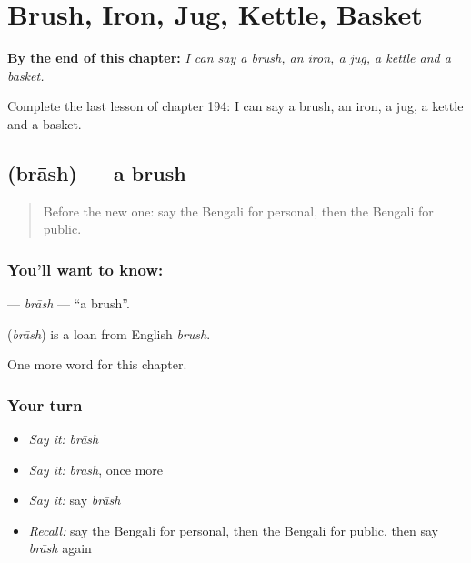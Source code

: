 
\chapter{Brush, Iron, Jug, Kettle, Basket}
\label{ch:bn-brush-iron-jug-kettle-basket}

\begin{chapteropening}
\textbf{By the end of this chapter:} \emph{I can say a brush, an iron, a jug, a kettle and a basket.}

Complete the last lesson of chapter 194: I can say a brush, an iron, a jug, a kettle and a basket.
\end{chapteropening}

\section[\texorpdfstring{\bn{ব্রাশ} (brāsh)}{ব্রাশ (brāsh)}]{ (brāsh) — a brush}

\label{lesson:BN-C194-brash}



\begin{quote}
Before the new one: say the Bengali for personal, then the Bengali for public.
\end{quote}

\subsection*{You'll want to know: }
\textbf{} — \emph{brāsh} — \textquotedblleft{}a brush\textquotedblright{}.

\begin{cousinweb}
\textbf{} (\emph{brāsh}) is a loan from English \emph{brush}.
\end{cousinweb}

\begin{grammarlens}[title={What you've built}]
One more word for this chapter.
\end{grammarlens}

\subsection*{Your turn}
\begin{itemize}
\raggedright
  \item \emph{Say it:} \emph{brāsh}
  \item \emph{Say it:} \emph{brāsh}, once more
  \item \emph{Say it:} say \emph{brāsh}
  \item \emph{Recall:} say the Bengali for personal, then the Bengali for public, then say \emph{brāsh} again
\end{itemize}

